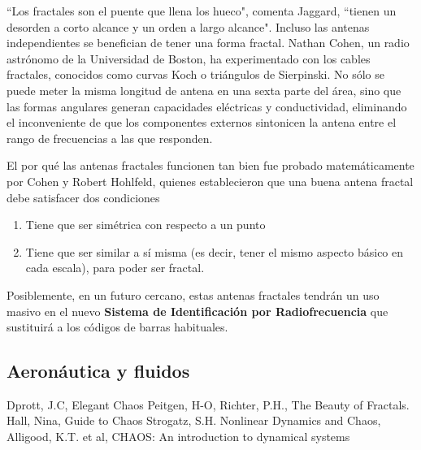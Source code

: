 ``Los fractales son el puente que llena los hueco", comenta Jaggard, ``tienen un desorden a corto alcance y un orden a largo alcance". Incluso las antenas independientes se benefician de tener una forma fractal. Nathan Cohen, un radio astrónomo de la Universidad de Boston, ha experimentado con los cables fractales, conocidos como curvas Koch o triángulos de Sierpinski. No sólo se puede meter la misma longitud de antena en una sexta parte del área, sino que las formas angulares generan capacidades eléctricas y conductividad, eliminando el inconveniente de que los componentes externos sintonicen la antena entre el rango de frecuencias a las que responden.

El por qué las antenas fractales funcionen tan bien fue probado matemáticamente por Cohen y Robert Hohlfeld, quienes establecieron que una buena antena fractal debe satisfacer dos condiciones
\begin{enumerate}
\item Tiene que ser simétrica con respecto a un punto
\item Tiene que ser similar a sí misma (es decir, tener el mismo aspecto básico en cada escala), para poder ser fractal.
\end{enumerate}

Posiblemente, en un futuro cercano, estas antenas fractales tendrán un uso masivo en el nuevo \textbf{Sistema de Identificación por Radiofrecuencia} que sustituirá a los códigos de barras habituales.

\subsection{Aeronáutica y fluidos}

\newpage

\begin{thebibliography}{1}
Dprott, J.C, Elegant Chaos
Peitgen, H-O, Richter, P.H., The Beauty of Fractals.
Hall, Nina, Guide to Chaos
Strogatz, S.H. Nonlinear Dynamics and Chaos,
Alligood, K.T. et al, CHAOS: An introduction to dynamical systems
\end{thebibliography}

